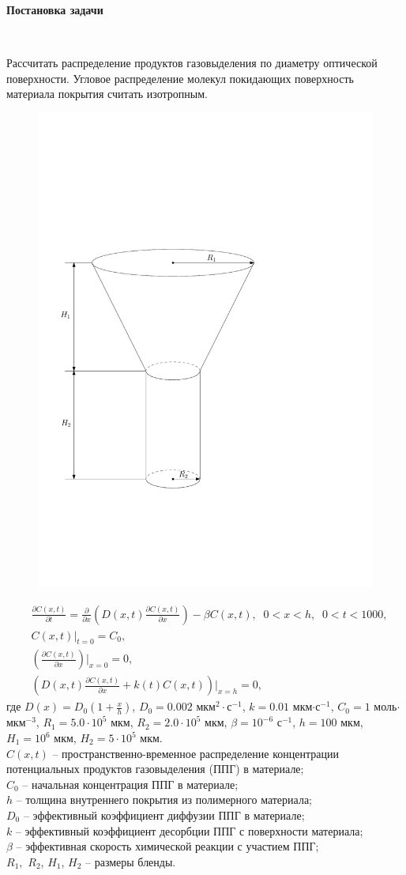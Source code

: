 \documentclass[
11pt,
master, %
subf, %
href, %
colorlinks=true, %
]{disser}
\newcommand*{\PartDif}[2]{\frac{\partial #1}{\partial #2}}
\newcommand*{\PartD}[1]{\frac{\partial}{\partial #1}}
\newcommand*{\SR}[1]{\left( #1 \right)}
\begin{document}
\setcounter{page}{2}
\setcounter{chapter}{0}
\setcounter{section}{1}

\tableofcontents

\newpage
\begin{center}
	\textbf{\Large Постановка задачи}
\end{center}


~

Рассчитать распределение продуктов газовыделения по диаметру оптической поверхности. Угловое распределение молекул покидающих поверхность материала покрытия считать изотропным.

\begin{figure}[h]
	\centering
	\includegraphics[width=0.3\linewidth]{pic}
	\caption{}
\end{figure}
\begin{align}
	&\PartDif{C(x,t)}{t} = \PartD{x}\SR{D(x,t)\PartDif{C(x,t)}{x}} - \beta C(x,t), \;\; 0 < x < h, \;\; 0 < t < 1000, \label{eq:1}\\
	&C(x,t)\bigg|_{t = 0} = C_0, \label{eq:2}\\
	&\SR{\PartDif{C(x,t)}{x}}\bigg|_{x = 0} = 0, \label{eq:3}\\
	&\SR{D(x,t)\PartDif{C(x,t)}{x} + k(t)C(x,t)}\bigg|_{x = h} = 0, \label{eq:4}
\end{align}
где $D(x) = D_0\SR{1 + \frac{x}{h}}$, $D_0 = 0.002$ мкм$^2\cdot$с$^{-1}$, $k = 0.01$ мкм$\cdot$с$^{-1}$, $C_0 = 1$ моль$\cdot$мкм$^{-3}$, $R_1 = 5.0 \cdot 10^{5}$ мкм, $R_2 = 2.0 \cdot 10^5$ мкм, $\beta = 10^{-6}$ с$^{-1}$, $h = 100$ мкм, $H_1 = 10^6$ мкм, $H_2 = 5 \cdot 10^5$ мкм.\\
$C(x,t)$ -- пространственно-временное распределение концентрации потенциальных продуктов газовыделения (ППГ) в материале;\\
$C_0$ -- начальная концентрация ППГ в материале;\\
$h$ -- толщина внутреннего покрытия из полимерного материала;\\
$D_0$ -- эффективный коэффициент диффузии ППГ в материале;\\
$k$ -- эффективный коэффициент десорбции ППГ с поверхности материала;\\
$\beta$ -- эффективная скорость химической реакции с участием ППГ;\\
$R_1,$ $R_2$, $H_1$, $H_2$ -- размеры бленды.
\end{document}

